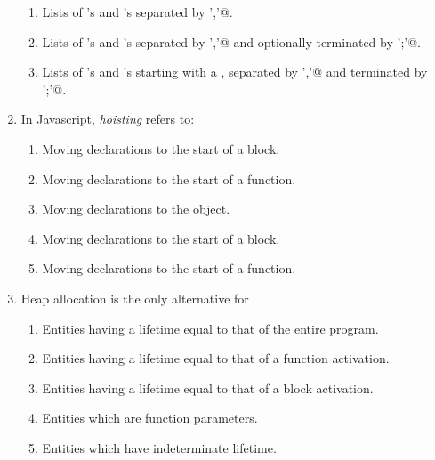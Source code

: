 \documentclass[12pt]{article}
\begin{document}
\begin{enumerate}
\begin{enumerate}
\item Lists of \verb@ID@'s and \verb@NUM@'s 
  separated by \verb@','@.
  
\item Lists of \verb@ID@'s and \verb@NUM@'s 
  separated by \verb@','@ and optionally terminated by \verb@';'@.
  
\item Lists of \verb@ID@'s and \verb@NUM@'s starting with a \verb@ID@,
  separated by \verb@','@ and terminated by \verb@';'@.
    
\end{enumerate}

\item In Javascript, \textit{hoisting} refers to:
\begin{enumerate}

\item Moving \verb@var@ declarations to the start
  of a block.

\item Moving \verb@var@ declarations to the start
  of a function.

\item Moving \verb@var@ declarations to the \verb@window@ object.

\item Moving \verb@let@ declarations to the start
  of a block.

\item Moving \verb@let@ declarations to the start
  of a function.

\end{enumerate}

\newpage


\item Heap allocation is the only alternative for

\begin{enumerate}

\item Entities having a lifetime equal to that of the entire
  program.

\item Entities having a lifetime equal to that of a function activation.

\item Entities having a lifetime equal to that of a block activation.

\item Entities which are function parameters.

\item Entities which have indeterminate lifetime.


\end{enumerate}
\end{enumerate}
\end{document}
